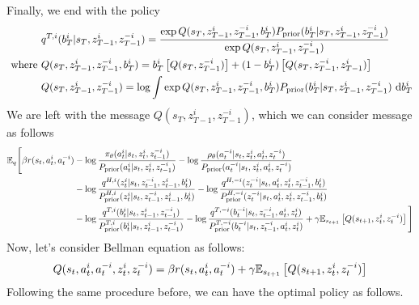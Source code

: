 Finally, we end with the policy
\begin{equation}
\begin{aligned}
    &q^{T,i}(b^i_T | s_T, z^i_{T-1}, z^{-i}_{T-1}) = \frac{\exp Q(s_T, z^i_{T-1}, z^{-i}_{T-1}, b^i_T) P_{\text{prior}}(b^i_T | s_T, z^i_{T-1}, z^{-i}_{T-1})}{\exp Q(s_T, z^i_{T-1}, z^{-i}_{T-1}) } \\
    \text{ where }&Q(s_T, z^i_{T-1}, z^{-i}_{T-1}, b^i_T)  = b^i_T\left[ Q(s_T,  z^{-i}_{T-1}) \right] + (1-b^i_T)\left[ Q(s_T,  z^{-i}_{T-1}, z^i_{T-1}) \right] \\
    &Q(s_T, z^i_{T-1}, z^{-i}_{T-1}) = \log \int \exp Q(s_T, z^i_{T-1}, z^{-i}_{T-1}, b^i_T) P_{\text{prior}}(b^i_T | s_T, z^i_{T-1}, z^{-i}_{T-1}) \ \mathrm{d} b^i_T
\end{aligned}
\end{equation}
We are left with the message $Q(s_T, z^i_{T-1}, z^{-i}_{T-1})$, which we can consider message as follows 
\begin{equation}
\begin{aligned}
    \mathbb{E}_q\Bigg[\beta r(s_t, a_t^i, a^{-i}_t) &- \log\frac{\pi_\theta(a^i_t | s_t, z^i_t, z^{-i}_{t-1})}{P_{\text{prior}}(a^i_t | s_t, z^i_t, z^{-i}_{t-1})} - \log\frac{\rho_\theta(a^{-i}_t | s_t, z^i_t, a^i_t, z^{-i}_t) }{P_{\text{prior}}(a^{-i}_t | s_t, z^i_t, a^i_t, z^{-i}_t)} \\
    &- \log\frac{q^{H, i}(z^i_t | s_t, z^{-i}_{t-1}, z^i_{t-1}, b^i_t)}{P^{H, i}_{\text{prior}}(z^i_t | s_t, z^{-i}_{t-1}, z^i_{t-1}, b^i_t)} - \log\frac{q^{H, -i}(z^{-i}_t | s_t, a^i_t, z^i_t, z^{-i}_{t-1}, b^i_t)}{P^{H, -i}_{\text{prior}}(z^{-i}_t | s_t, a^i_t, z^i_t, z^{-i}_{t-1}, b^i_t)} \\
    &- \log\frac{q^{T,i}(b^i_t | s_t, z^i_{t-1}, z^{-i}_{t-1})}{P^{T,i}_{\text{prior}}(b^i_t | s_t, z^i_{t-1}, z^{-i}_{t-1})} - \log\frac{q^{T,-i}(b^{-i}_t | s_t,  z^{-i}_{t-1}, a^i_t, z^i_t)}{P^{T,-i}_{\text{prior}}(b^{-i}_t | s_t,  z^{-i}_{t-1}, a^i_t, z^i_t) } + \gamma\mathbb{E}_{s_{t+1}}\left[ Q(s_{t+1}, z^i_{t}, z^{-i}_{t}) \right]\Bigg]
\end{aligned}
\end{equation}
Now, let's consider Bellman equation as follows:
\begin{equation}
    Q(s_t, a_t^i, a^{-i}_t, z^i_{t}, z^{-i}_{t} ) = \beta r(s_t, a_t^i, a^{-i}_t) + \gamma\mathbb{E}_{s_{t+1}}\left[ Q(s_{t+1}, z^i_{t}, z^{-i}_{t}) \right]
\end{equation}
Following the same procedure before, we can have the optimal policy as follows.  